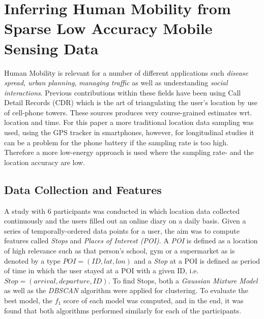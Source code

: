 \section{Inferring Human Mobility from Sparse Low Accuracy Mobile Sensing Data}
Human Mobility is relevant for a number of different applications such \textit{disease spread,} \textit{urban planning}, \textit{managing traffic }as well as understanding \textit{social interactions}. Previous contributions within these fields have been using Call Detail Records (CDR) which is the art of triangulating the user's location by use of cell-phone towers. These sources produces very course-grained estimates wrt. location and time. For this paper a more traditional location data sampling was used, using the GPS tracker in smartphones, however, for longitudinal studies it can be a problem for the phone battery if the sampling rate is too high. Therefore a more low-energy approach is used where the sampling rate- and the location accuracy are low. 

\subsection{Data Collection and Features}
A study with 6 participants was conducted in which location data collected continuously and the users filled out an online diary on a daily basis. Given a series of temporally-ordered data points for a user, the aim was to compute features called \textit{Stops} and \textit{Places of Interest (POI)}. A \textit{POI} is defined as a location of high relevance such as that person's school, gym or a supermarket as is denoted by a type $POI = (ID, lat, lon)$ and a \textit{Stop} at a POI is defined as period of time in which the user stayed at a POI with a given ID, i.e. $Stop = (arrival, departure, ID)$. To find Stops, both a \textit{Gaussian Mixture Model} as well as the \textit{DBSCAN} algorithm were applied for clustering. To evaluate the best model, the $f_1$ score of each model was computed, and in the end, it was found that both algorithms performed similarly for each of the participants. 